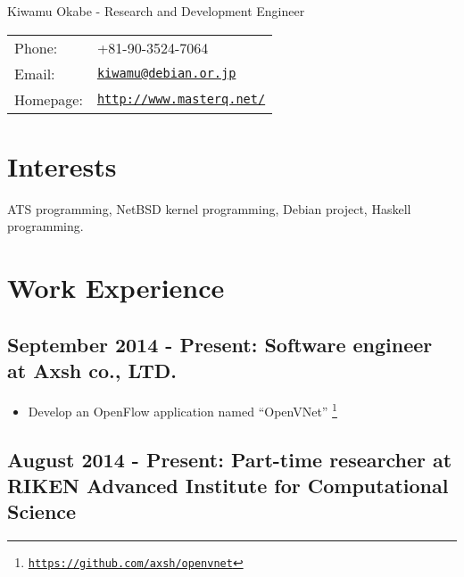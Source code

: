 \documentclass[letterpaper]{article}
\def\name{Kiwamu Okabe - Research and Development Engineer}
\begin{document}
{\huge \name}


\vspace{0.25in}

\begin{minipage}{0.3\linewidth}
  \begin{tabular}{ll}
    Phone: & +81-90-3524-7064 \\
    Email: & \href{mailto:kiwamu@debian.or.jp}{\tt kiwamu@debian.or.jp} \\
    Homepage: & \href{http://www.masterq.net/}{\tt http://www.masterq.net/} \\
  \end{tabular}
\end{minipage}

\section*{Interests}

ATS programming, NetBSD kernel programming, Debian project, Haskell programming.


\section*{Work Experience}
\subsection*{September 2014 - Present: Software engineer at Axsh co., LTD.}

\begin{itemize}
  \item Develop an OpenFlow application named ``OpenVNet'' \footnote{\href{https://github.com/axsh/openvnet}{\tt https://github.com/axsh/openvnet}}
\end{itemize}

\subsection*{August 2014 - Present: Part-time researcher at RIKEN Advanced Institute for Computational Science}
\end{document}
